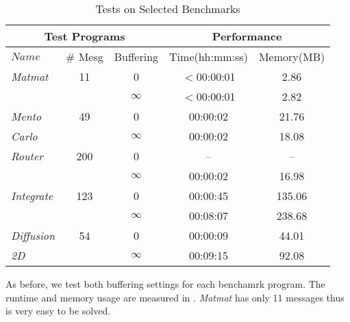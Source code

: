\begin{table}[t]
\begin{center}
\scriptsize
\caption{Tests on Selected Benchmarks}\label{table:benchmarks}
\begin{tabular}{|l|c|c|c|c|}
		\hline
         \multicolumn{3}{|c|}{Test Programs} & \multicolumn{2}{|c|}{Performance} \\ \hline
          $Name$&\# Mesg&Buffering&Time(hh:mm:ss)&Memory(MB) \\ \hline
           \textit{Matmat} & 11 & 0 & $<$00:00:01 & 2.86\\
          	      & &  $\infty$ & $<$00:00:01 & 2.82\\ \hline
	 \textit{Mento} & 49 & 0 & 00:00:02 & 21.76\\
          \textit{Carlo}    & & $\infty$ & 00:00:02 & 18.08 \\ \hline
	 \textit{Router}   & 200 & 0 & -- & --\\
          	      & & $\infty$ & 00:00:02 & 16.98 \\ \hline
	 \textit{Integrate}  & 123 & 0 & 00:00:45 & 135.06 \\
          	      & & $\infty$ & 00:08:07 & 238.68\\ \hline
	  \textit{Diffusion}  & 54 & 0 & 00:00:09 & 44.01 \\
           \textit{2D} &  & $\infty$ & 00:09:15 & 92.08\\ \hline          
          		\end{tabular}
\end{center}
\end{table}

As before, we test both buffering settings for each benchamrk program. The runtime and memory usage are  measured in . \textit{Matmat} has only 11 messages thus is very easy to be solved. 


